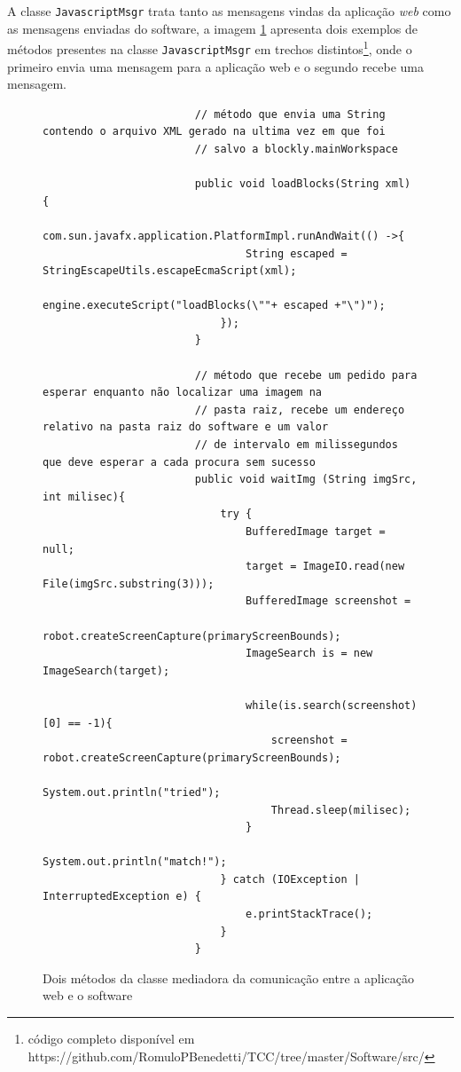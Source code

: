 \documentclass[tg]{mdtufsm}
\begin{document}
                    A classe \texttt{JavascriptMsgr} trata tanto as mensagens vindas da aplicação \emph{web} como as mensagens enviadas do software, a imagem \ref{code:javascriptmsg.java} apresenta dois exemplos de métodos presentes na classe \texttt{JavascriptMsgr} em trechos distintos\footnote{código completo disponível em https://github.com/RomuloPBenedetti/TCC/tree/master/Software/src/}, onde o primeiro envia uma mensagem para a aplicação web e o segundo recebe uma mensagem.


                    \begin{figure}[!htb]
                    \begin{lstlisting}
                        // método que envia uma String contendo o arquivo XML gerado na ultima vez em que foi
                        // salvo a blockly.mainWorkspace

                        public void loadBlocks(String xml) {
                            com.sun.javafx.application.PlatformImpl.runAndWait(() ->{
                                String escaped = StringEscapeUtils.escapeEcmaScript(xml);
                                engine.executeScript("loadBlocks(\""+ escaped +"\")");
                            });
                        }

                        // método que recebe um pedido para esperar enquanto não localizar uma imagem na
                        // pasta raiz, recebe um endereço relativo na pasta raiz do software e um valor
                        // de intervalo em milissegundos que deve esperar a cada procura sem sucesso
                        public void waitImg (String imgSrc, int milisec){
                            try {
                                BufferedImage target = null;
                                target = ImageIO.read(new File(imgSrc.substring(3)));
                                BufferedImage screenshot =
                                    robot.createScreenCapture(primaryScreenBounds);
                                ImageSearch is = new ImageSearch(target);

                                while(is.search(screenshot)[0] == -1){
                                    screenshot = robot.createScreenCapture(primaryScreenBounds);
                                    System.out.println("tried");
                                    Thread.sleep(milisec);
                                }
                                System.out.println("match!");
                            } catch (IOException | InterruptedException e) {
                                e.printStackTrace();
                            }
                        }
                    \end{lstlisting}
                        \caption{Dois métodos da classe mediadora da comunicação entre a aplicação web e o software}
                    	\label{code:javascriptmsg.java}
                    \end{figure}
\end{document}
